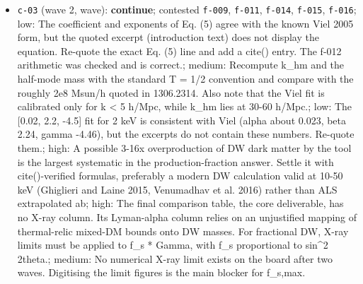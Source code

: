 \documentclass[11pt,a4paper]{article}
\begin{document}
\begin{itemize}
  \item \texttt{c-03} (wave 2, wave): \textbf{continue}; contested \texttt{f-009}, \texttt{f-011}, \texttt{f-014}, \texttt{f-015}, \texttt{f-016}; low: The coefficient and exponents of Eq. (5) agree with the known Viel 2005 form, but the quoted excerpt (introduction text) does not display the equation. Re-quote the exact Eq. (5) line and add a cite() entry. The f-012 arithmetic was checked and is correct.; medium: Recompute k\_hm and the half-mode mass with the standard T = 1/2 convention and compare with the roughly 2e8 Msun/h quoted in 1306.2314. Also note that the Viel fit is calibrated only for k \textless{} 5 h/Mpc, while k\_hm lies at 30-60 h/Mpc.; low: The [0.02, 2.2, -4.5] fit for 2 keV is consistent with Viel (alpha about 0.023, beta 2.24, gamma -4.46), but the excerpts do not contain these numbers. Re-quote them.; high: A possible 3-16x overproduction of DW dark matter by the tool is the largest systematic in the production-fraction answer. Settle it with cite()-verified formulas, preferably a modern DW calculation valid at 10-50 keV (Ghiglieri and Laine 2015, Venumadhav et al. 2016) rather than ALS extrapolated ab; high: The final comparison table, the core deliverable, has no X-ray column. Its Lyman-alpha column relies on an unjustified mapping of thermal-relic mixed-DM bounds onto DW masses. For fractional DW, X-ray limits must be applied to f\_s * Gamma, with f\_s proportional to sin\textasciicircum{}2 2theta.; medium: No numerical X-ray limit exists on the board after two waves. Digitising the limit figures is the main blocker for f\_s,max.

\end{itemize}
\end{document}
